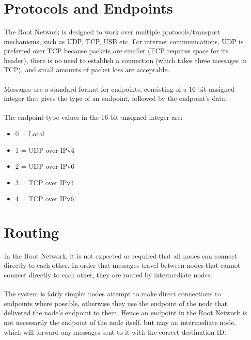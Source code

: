 \documentclass{article}
\begin{document}
\section{Protocols and Endpoints}

\paragraph{}
The Root Network is designed to work over multiple protocols/transport mechanisms, such as UDP, TCP, USB etc. For internet communications, UDP is preferred over TCP because packets are smaller (TCP requires space for its header), there is no need to establish a connection (which takes three messages in TCP), and small amounts of packet loss are acceptable.

\paragraph{}
Messages use a standard format for endpoints, consisting of a 16 bit unsigned integer that gives the type of an endpoint, followed by the endpoint's data.

\paragraph{}
The endpoint type values in the 16 bit unsigned integer are:

\begin{itemize}
\item 0 = Local
\item 1 = UDP over IPv4
\item 2 = UDP over IPv6
\item 3 = TCP over IPv4
\item 4 = TCP over IPv6
\end{itemize}

\section{Routing}

\paragraph{}
In the Root Network, it is not expected or required that all nodes can connect directly to each other. In order that messages travel between nodes that cannot connect directly to each other, they are routed by intermediate nodes.

\paragraph{}
The system is fairly simple: nodes attempt to make direct connections to endpoints where possible, otherwise they use the endpoint of the node that delivered the node's endpoint to them. Hence an endpoint in the Root Network is not necessarily the endpoint of the node itself, but may an intermediate node, which will forward any messages sent to it with the correct destination ID.
\end{document}
